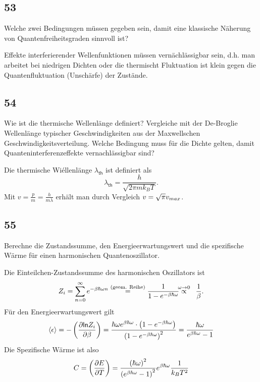 \subsection{53}
\begin{myfrag}
Welche zwei Bedingungen müssen gegeben sein, damit eine klassische
Näherung von Quantenfreiheitsgraden sinnvoll ist?
\end{myfrag}
Effekte interferierender Wellenfunktionen müssen vernächlässigbar sein, d.h. man arbeitet bei niedrigen Dichten oder die thermischt Fluktuation ist klein gegen die Quantenfluktuation (Unschärfe) der Zustände.
\subsection{54}
\begin{myfrag}
Wie ist die thermische Wellenlänge definiert? Vergleiche mit der De-Broglie
Wellenlänge typischer Geschwindigkeiten aus der Maxwellschen
Geschwindigkeitsverteilung. Welche Bedingung muss für die Dichte gelten,
damit Quanteninterferenzeffekte vernachlässigbar sind?
\end{myfrag}
Die thermische Wiéllenlänge $\lambda_\mathsf{th}$ ist definiert als
\begin{equation}
	\lambda_\mathsf{th}=\frac{h}{\sqrt{2\pi mk_BT}}.
\end{equation}
Mit $v=\frac{p}{m}=\frac{h}{m\lambda}$ erhält man durch Vergleich $v=\sqrt{\pi}v_{max}$.
\subsection{55}
\begin{myfrag}
Berechne die Zustandssumme, den Energieerwartungswert und die
spezifische Wärme für einen harmonischen Quantenoszillator.
\end{myfrag}
Die Einteilchen-Zustandssumme des harmonischen Oszillators ist
\begin{equation}
	Z_i=\sum\limits_{n=0}^\infty e^{-\beta\hbar\omega n}\oldoverset{\text{(geom. Reihe)}}=\frac{1}{1-e^{-\beta\hbar\omega}}\overset{\omega\rightarrow 0}\propto\frac{1}{\beta}\label{eq:1teil-quharmosz}.
\end{equation}
Für den Energieerwartungswert gilt
\begin{equation}
	\langle\epsilon\rangle=-\left(\frac{\partial \mathsf{ln} Z_i}{\partial \beta}\right)=\frac{\hbar\omega e^{\beta\hbar\omega}\cdot\left(1-e^{-\beta\hbar\omega}\right)}{\left(1-e^{-\beta\hbar\omega}\right)^2}=\frac{\hbar\omega}{e^{\beta\hbar\omega}-1}
\end{equation}
Die Spezifische Wärme ist also
\begin{equation}
	C=\left(\frac{\partial E}{\partial T}\right)=\frac{\left(\hbar\omega\right)^2}{\left(e^{\beta\hbar\omega}-1\right)^2}e^{\beta\hbar\omega}\frac{1}{k_BT^2}
\end{equation}
